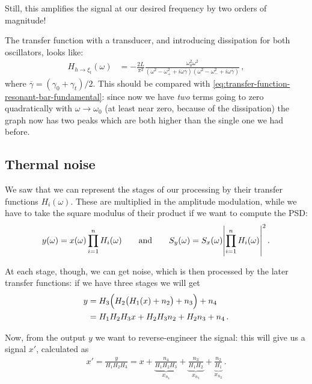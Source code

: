 \documentclass[main.tex]{subfiles}
\begin{document}
Still, this amplifies the signal at our desired frequency by two orders of magnitude!

The transfer function with a transducer, and introducing dissipation for both oscillators, looks like: 
%
\begin{align}
H_{h \to \xi_{t}} (\omega ) &= - \frac{2L}{\pi^2} \frac{\omega_0^2 \omega^2}{ (\omega^2 - \omega_{+}^2 + i \omega \overline{\gamma})(\omega^2 - \omega_{-}^2 + i \omega \overline{\gamma})}
\,,
\end{align}
%
where \(\overline{\gamma} = (\gamma_0 + \gamma_{t}) / 2\).
This should be compared with \eqref{eq:transfer-function-resonant-bar-fundamental}: since now we have \emph{two} terms going to zero quadratically with \(\omega \to \omega_0 \) (at least near zero, because of the dissipation) the graph now has two peaks which are both higher than the single one we had before.  

\subsection{Thermal noise}

We saw that we can represent the stages of our processing by their transfer functions \(H_{i}(\omega )\). These are multiplied in the amplitude modulation, while we have to take the square modulus of their product if we want to compute the PSD: 
%
\begin{align}
y(\omega ) = x(\omega ) \prod_{i=1}^{n} H_i(\omega )
\qquad \text{and} \qquad
S_y(\omega ) = S_x(\omega ) \abs{\prod_{i=1}^{n} H_i(\omega )}^2
\,.
\end{align}
%

At each stage, though, we can get noise,
which is then processed by the later transfer functions: if we have three stages we will get 
%
\begin{align}
y &= H_3 \qty( H_2 \qty( H_1 \qty(x) + n_2) + n_3) + n_4  \\
&= H_1 H_2 H_3 x + H_2 H_3 n_2 + H_2 n_3 + n_4 
\,.
\end{align}

Now, from the output \(y\) we want to reverse-engineer the signal: this will give us a signal \(x'\), calculated as 
%
\begin{align}
x' = \frac{y}{H_1 H_2 H_3 } = 
x + \underbrace{\frac{n_4 }{H_1 H_2 H_3 }}_{x_{n_4}} + \underbrace{\frac{n_3 }{H_1 H_2  }}_{x_{n_3 }}
+ \underbrace{\frac{n_2}{H_1 }}_{x_{n_2 }}
\,.
\end{align}
\end{document}
